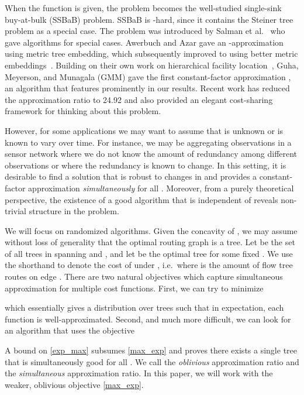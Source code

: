 \documentclass[11pt]{article}
\begin{document}
When the function  is given, the problem becomes the well-studied
single-sink buy-at-bulk (SSBaB) problem.  SSBaB is -hard, since it
contains the Steiner tree problem as a special case.  The problem was
introduced by Salman et al.~\cite{salman1997bbn} who gave algorithms for
special cases.  Awerbuch and Azar \cite{awerbuch1997bbn} gave an -approximation using metric tree embedding, which subsequently improved to
 using better metric embeddings~\cite{bartal1998aam,
fakcharoenphol2003tba}.  Building on their own work on hierarchical facility
location~\cite{guha2000hpa}, Guha, Meyerson, and Munagala (GMM) gave the first
constant-factor approximation \cite{guha2001cfa}, an algorithm that features
prominently in our results.  Recent work \cite{talwar2002ssb, gupta2003sab,
jothi2004iaa, grandoni2006ias} has reduced the approximation ratio to 24.92
and also provided an elegant cost-sharing framework for thinking about this
problem.

However, for some applications we may want to assume that  is unknown or is
known to vary over time. For instance, we may be aggregating observations in a
sensor network where we do not know the amount of redundancy among different
observations or where the redundancy is known to change. In this setting, it
is desirable to find a solution that is robust to changes in  and provides
a constant-factor approximation {\em simultaneously} for all .  Moreover, from a purely theoretical perspective, the existence
of a good algorithm that is independent of  reveals non-trivial structure
in the problem.

We will focus on randomized algorithms.
Given the concavity of , we may assume without loss of
generality that the optimal routing graph is a tree.  Let  be the
set of all trees in  spanning  and , and let  be the
optimal tree for some fixed .  We use the shorthand  to denote the
cost of  under , i.e.\  where  is the
amount of flow tree  routes on edge .  
There are two natural objectives which capture simultaneous approximation for multiple cost functions.  
First, we can try to minimize

which essentially gives a distribution over trees such that in expectation,
each function  is well-approximated.  Second, and much more difficult, we
can look for an algorithm that uses the objective

A bound on \eqref{exp_max} subsumes \eqref{max_exp} and proves there exists a
single tree that is simultaneously good for all . 
We call  the {\em oblivious} approximation ratio and  the {\em simultaneous} approximation ratio.
In this paper, we will
work with the weaker, oblivious objective \eqref{max_exp}.
\end{document}
